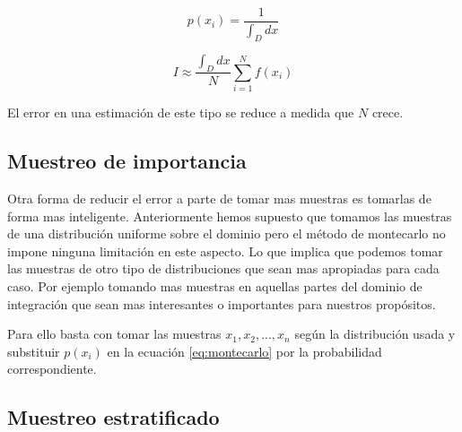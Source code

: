 \begin{equation}
p(x_i) = \frac{1}{\int _D dx}
\end{equation}

\begin{equation}
I \approx \frac{\int _D dx}{N} \sum_{i=1} ^N f(x_i)
\end{equation}

El error en una estimación de este tipo se reduce a medida que $N$ crece.
\clearpage

\subsection{Muestreo de importancia}
    
Otra forma de reducir el error a parte de tomar mas muestras es tomarlas de forma mas inteligente. Anteriormente hemos supuesto que tomamos las muestras de una distribución uniforme sobre el dominio pero el método de montecarlo no impone ninguna limitación en este aspecto. Lo que implica que podemos tomar las muestras de otro tipo de distribuciones que sean mas apropiadas para cada caso. Por ejemplo tomando mas muestras en aquellas partes del dominio de integración que sean mas interesantes o importantes para nuestros propósitos.

\medskip

Para ello basta con tomar las muestras $x_1, x_2, ..., x_n$ según la distribución usada y substituir $p(x_i)$ en la ecuación \ref{eq:montecarlo} por la probabilidad correspondiente.

\subsection{Muestreo estratificado}


